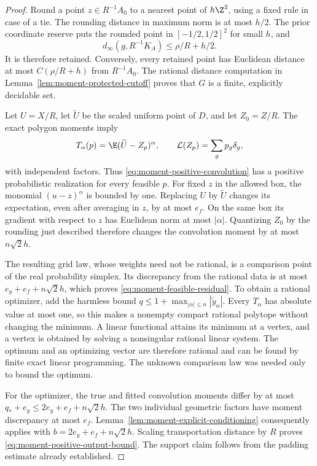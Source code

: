 \begin{proof}
Round a point $z\in R^{-1}A_0$ to a nearest point of $h\Z^2$,
using a fixed rule in case of a tie.  The rounding distance in
maximum norm is at most $h/2$.  The prior coordinate reserve puts
the rounded point in $[-1/2,1/2]^2$ for small $h$, and
\[
 d_\infty(g,R^{-1}K_A)\le\rho/R+h/2.
\]
It is therefore retained.  Conversely, every retained point has
Euclidean distance at most $C(\rho/R+h)$ from $R^{-1}A_0$.
The rational distance computation in
Lemma~\ref{lem:moment-protected-cutoff} proves that $G$ is a
finite, explicitly decidable set.

Let $U=X/R$, let $\widetilde U$ be the scaled uniform point of
$D$, and let $Z_0=Z/R$.  The exact polygon moments imply
\[
 T_\alpha(p)=\E(\widetilde U-Z_p)^\alpha,
 \qquad \mathcal L(Z_p)=\sum_gp_g\delta_g,
\]
with independent factors.  Thus \eqref{eq:moment-positive-convolution}
has a positive probabilistic realization for every feasible $p$.
For fixed $z$ in the allowed box, the monomial
$(u-z)^\alpha$ is bounded by one.  Replacing $U$ by
$\widetilde U$ changes its expectation, even after averaging in
$z$, by at most $e_f$.  On the same box its gradient with respect
to $z$ has Euclidean norm at most $|\alpha|$.  Quantizing $Z_0$
by the rounding just described therefore changes the convolution
moment by at most $n\sqrt2h$.

The resulting grid law, whose weights need not be rational, is a
comparison point of the real probability simplex.  Its discrepancy
from the rational data is at most $e_y+e_f+n\sqrt2h$, which
proves \eqref{eq:moment-feasible-residual}.  To obtain a rational
optimizer, add the harmless bound
$q\le1+\max_{|\alpha|\le n}|\widetilde y_\alpha|$.
Every $T_\alpha$ has absolute value at most one, so this makes a
nonempty compact rational polytope without changing the minimum.
A linear functional attains its minimum at a vertex, and a vertex
is obtained by solving a nonsingular rational linear system.
The optimum and an optimizing vector are therefore rational and
can be found by finite exact linear programming.  The unknown
comparison law was needed only to bound the optimum.

For the optimizer, the true and fitted convolution moments differ
by at most $q_*+e_y\le2e_y+e_f+n\sqrt2h$.  The two individual
geometric factors have moment discrepancy at most $e_f$.
Lemma~\ref{lem:moment-explicit-conditioning} consequently applies
with $b=2e_y+e_f+n\sqrt2h$.  Scaling transportation distance by
$R$ proves \eqref{eq:moment-positive-output-bound}.  The support
claim follows from the padding estimate already established.
\end{proof}

